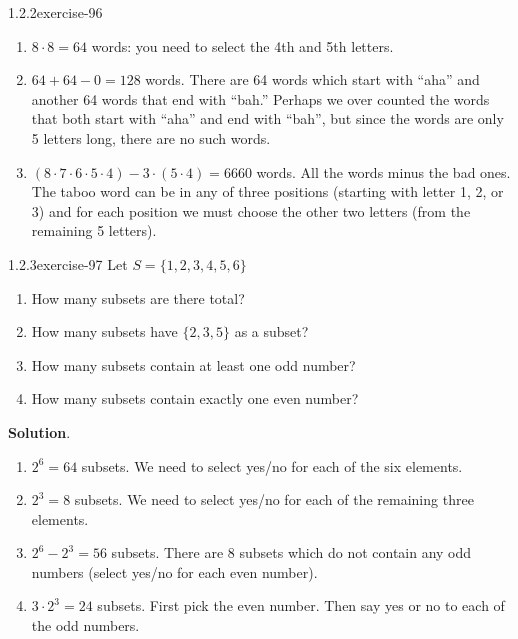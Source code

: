 \documentclass[twoside,11pt,]{book}
\numberwithin{equation}{chapter}
\begin{document}
\begin{divisionsolution}{1.2.2}{}{exercise-96}
\begin{enumerate}[label=(\alph*)]
\item\hypertarget{li-1079}{}\hypertarget{p-1530}{}%
\(8 \cdot 8 =64\) words: you need to select the 4th and 5th letters.%
\item\hypertarget{li-1080}{}\hypertarget{p-1531}{}%
\(64 + 64 - 0 = 128\) words. There are 64 words which start with ``aha'' and another 64 words that end with ``bah.'' Perhaps we over counted the words that both start with ``aha'' and end with ``bah'', but since the words are only 5 letters long, there are no such words.%
\item\hypertarget{li-1081}{}\hypertarget{p-1532}{}%
\((8\cdot 7\cdot 6\cdot 5\cdot 4) - 3\cdot (5\cdot 4) = 6660\) words. All the words minus the bad ones. The taboo word can be in any of three positions (starting with letter 1, 2, or 3) and for each position we must choose the other two letters (from the remaining 5 letters).%
\end{enumerate}
%
\end{divisionsolution}%
\begin{divisionsolution}{1.2.3}{}{exercise-97}%
\hypertarget{p-1543}{}%
Let \(S = \{1, 2, 3, 4, 5, 6\}\)\leavevmode%
\begin{enumerate}[label=(\alph*)]
\item\hypertarget{li-1090}{}\hypertarget{p-1544}{}%
How many subsets are there total?%
\item\hypertarget{li-1091}{}\hypertarget{p-1546}{}%
How many subsets have \(\{2,3,5\}\) as a subset?%
\item\hypertarget{li-1092}{}\hypertarget{p-1548}{}%
How many subsets contain at least one odd number?%
\item\hypertarget{li-1093}{}\hypertarget{p-1550}{}%
How many subsets contain exactly one even number?%
\end{enumerate}
%
\par\smallskip%
\noindent\textbf{Solution}.\quad%
\hypertarget{p-1552}{}%
\leavevmode%
\begin{enumerate}[label=(\alph*)]
\item\hypertarget{li-1094}{}\hypertarget{p-1553}{}%
\(2^6 = 64\) subsets. We need to select yes/no for each of the six elements.%
\item\hypertarget{li-1095}{}\hypertarget{p-1554}{}%
\(2^3 = 8\) subsets. We need to select yes/no for each of the remaining three elements.%
\item\hypertarget{li-1096}{}\hypertarget{p-1555}{}%
\(2^6 - 2^3 = 56\) subsets. There are 8 subsets which do not contain any odd numbers (select yes/no for each even number).%
\item\hypertarget{li-1097}{}\hypertarget{p-1556}{}%
\(3\cdot 2^3 = 24\) subsets. First pick the even number. Then say yes or no to each of the odd numbers.%
\end{enumerate}
%
\end{divisionsolution}%
\end{document}
